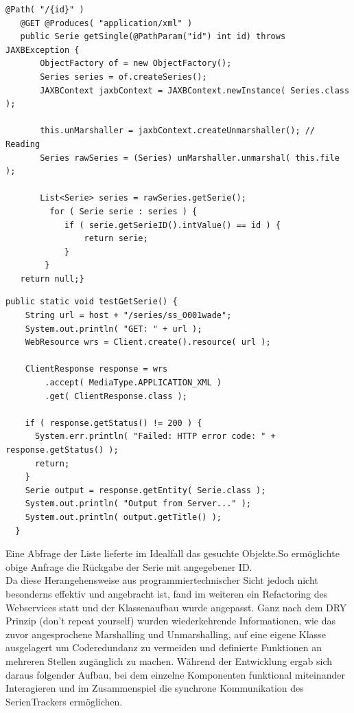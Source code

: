 \begin{lstlisting}[label=getsingleseriesservice,caption= GET Testmethode der SeriesID]
   @Path( "/{id}" )
   @GET @Produces( "application/xml" )
   public Serie getSingle(@PathParam("id") int id) throws JAXBException {
       ObjectFactory of = new ObjectFactory();
       Series series = of.createSeries();
       JAXBContext jaxbContext = JAXBContext.newInstance( Series.class );

       this.unMarshaller = jaxbContext.createUnmarshaller(); // Reading
       Series rawSeries = (Series) unMarshaller.unmarshal( this.file );

       List<Serie> series = rawSeries.getSerie();
         for ( Serie serie : series ) {
            if ( serie.getSerieID().intValue() == id ) {
                return serie;
            }
        }
   return null;}
\end{lstlisting}
\begin{lstlisting}[label=testclient,caption= Anfrage des Testclients nach Serie mit angegebener ID]
public static void testGetSerie() {
    String url = host + "/series/ss_0001wade";
    System.out.println( "GET: " + url );
    WebResource wrs = Client.create().resource( url );

    ClientResponse response = wrs
        .accept( MediaType.APPLICATION_XML )
        .get( ClientResponse.class );

    if ( response.getStatus() != 200 ) {
      System.err.println( "Failed: HTTP error code: " + response.getStatus() );
      return;
    }
    Serie output = response.getEntity( Serie.class );
    System.out.println( "Output from Server..." );
    System.out.println( output.getTitle() );
  }
\end{lstlisting}

Eine Abfrage der Liste lieferte im Idealfall das gesuchte Objekte.So ermöglichte obige Anfrage die Rückgabe der Serie mit angegebener ID.\\
Da diese Herangehensweise aus programmiertechnischer Sicht jedoch nicht besonderns effektiv und angebracht ist, fand im weiteren ein Refactoring des Webservices statt und der Klassenaufbau wurde angepasst. Ganz nach dem DRY Prinzip (don't repeat yourself) wurden wiederkehrende Informationen, wie das zuvor angesprochene Marshalling und Unmarshalling, auf eine eigene Klasse ausgelagert um Coderedundanz zu vermeiden und definierte Funktionen an mehreren Stellen zugänglich zu machen. Während der Entwicklung ergab sich daraus folgender Aufbau, bei dem einzelne Komponenten funktional miteinander Interagieren und im Zusammenspiel die synchrone Kommunikation des SerienTrackers ermöglichen.

